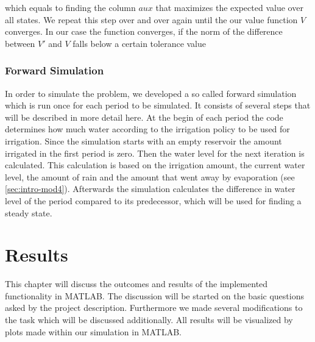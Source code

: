 \documentclass[12pt, a4paper, oneside]{article}
\begin{document}
which equals to finding the column $aux$ that maximizes the expected value over all states.
We repeat this step over and over again until the our value function $V$ converges.
In our case the function converges, if the norm of the difference between $V'$ and $V$ falls below a certain tolerance value \\

\subsubsection{Forward Simulation}
In order to simulate the problem, we developed a so called forward simulation which is run once for each period to be simulated.
It consists of several steps that will be described in more detail here.
At the begin of each period the code determines how much water according to the irrigation policy to be used for irrigation.
Since the simulation starts with an empty reservoir the amount irrigated in the first period is zero.
Then the water level for the next iteration is calculated.
This calculation is based on the irrigation amount, the current water level, the amount of rain and the amount that went away by evaporation (see \ref{sec:intro-mod4}).
Afterwards the simulation calculates the difference in water level of the period compared to its predecessor, which will be used for finding a steady state.

\newpage
\section{Results}
This chapter will discuss the outcomes and results of the implemented functionality in MATLAB.
The discussion will be started on the basic questions asked by the project description.
Furthermore we made several modifications to the task which will be discussed additionally.
All results will be visualized by plots made within our simulation in MATLAB.
\end{document}

